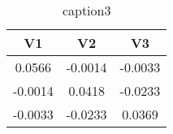 \begin{table}[tb]
\centering
\begin{tabular}{ccc}
  \toprule
  V1 & V2 & V3\\
  \midrule
  0.0566 & -0.0014 & -0.0033 \\
  -0.0014 & 0.0418 & -0.0233 \\
  -0.0033 & -0.0233 & 0.0369 \\
  \bottomrule
\end{tabular}
\caption{caption3}\label{tab:label}
\end{table}
